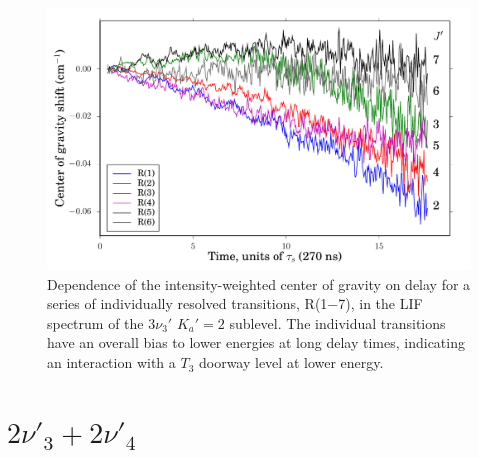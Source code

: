 \documentclass[12pt]{mitthesis}
\begin{document}
\begin{figure}
  \caption{Dependence of the intensity-weighted center of gravity on
    delay for a series of individually resolved transitions, R(1$-$7),
    in the LIF spectrum of the $3\nu_3'$ $K_a'\!=\!2$ sublevel.  The
    individual transitions have an overall bias to lower energies at
    long delay times, indicating an interaction with a $T_3$ doorway
    level at lower energy.}
  \label{fig:33k2-r123456-cog}
  \centering
  \includegraphics[width=6in]{33k2-r123456-cog-delay.pdf}
\end{figure}


\section{$2\nu'_3+2\nu'_4$}
\end{document}
